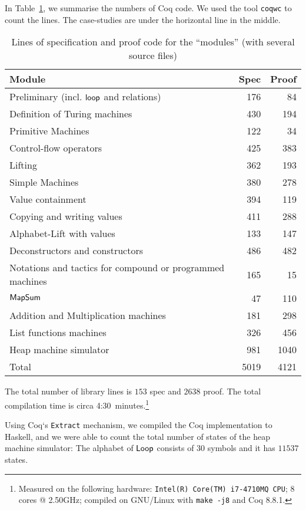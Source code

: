 In Table~\ref{tab:coq-lines}, we summarise the numbers of Coq code.  We used the tool \texttt{coqwc} to count the lines.  The case-studies are under
the horizontal line in the middle.
\begin{table}[h]
  \centering
  \begin{tabular}{p{6.5cm}|r|r}
    Module                                    & Spec & Proof\\ \hline
    Preliminary (incl. $\mathsf{loop}$ and relations) &  176 &   84 \\
    Definition of Turing machines             &  430 &  194 \\
    Primitive Machines                        &  122 &   34 \\
    Control-flow operators                    &  425 &  383 \\
    Lifting                                   &  362 &  193 \\
    Simple Machines                           &  380 &  278 \\
    Value containment                         &  394 &  119 \\
    Copying and writing values                &  411 &  288 \\
    Alphabet-Lift with values                 &  133 &  147 \\
    Deconstructors and constructors           &  486 &  482 \\
    Notations and tactics for compound
    or programmed machines                    &  165 &   15 \\  \hline
    $\mathsf{MapSum}$                             &   47 &  110 \\
    Addition and Multiplication machines      &  181 &  298 \\
    List functions machines                   &  326 &  456 \\
    Heap machine simulator                    &  981 & 1040 \\ \hline\hline
    Total                                     & 5019 & 4121 \\
  \end{tabular}
  \caption{Lines of specification and proof code for the ``modules'' (with several source files)}
  \label{tab:coq-lines}
\end{table}

The total number of library lines is $153$ spec and $2638$ proof.  The total compilation time is circa 4:30~minutes.\footnote{Measured on the
  following hardware: \texttt{Intel(R) Core(TM) i7-4710MQ CPU}; 8 cores @ 2.50GHz; compiled on GNU/Linux with \texttt{make -j8} and Coq 8.8.1.}

Using Coq`s \texttt{Extract} mechanism, we compiled the Coq implementation to Haskell, and we were able to count the total number of states of the
heap machine simulator: The alphabet of $\mathsf{Loop}$ consists of $30$ symbols and it has $11537$ states.



